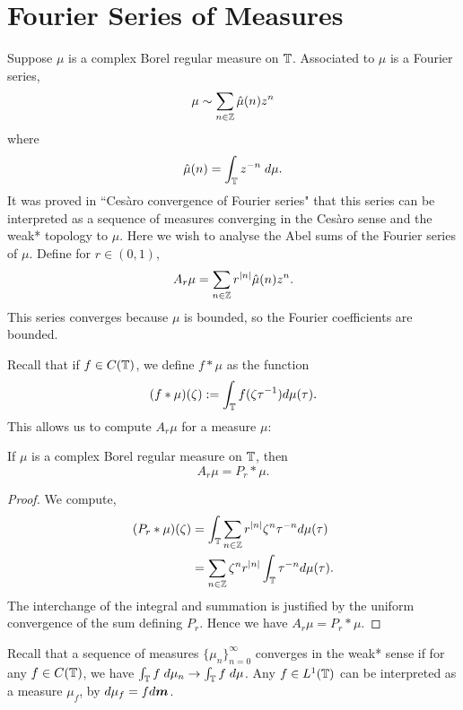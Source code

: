\section{Fourier Series of Measures}
Suppose $\mu$ is a complex Borel regular measure on $\mathbb{T}$. Associated
to $\mu$ is a Fourier series,
\begin{equation*}
    \mu \sim \sum_{n \in \mathbb{Z}} \hat{\mu}(n) z^n
\end{equation*}
where
\begin{equation*}
    \hat{\mu}(n) = \int_{\mathbb{T}} z^{-n} \;d\mu.
\end{equation*}
It was proved in ``Ces\`aro convergence of Fourier series" that this series
can be interpreted as a sequence of measures converging in the Ces\`aro sense
and the weak* topology to $\mu$. Here we wish to analyse the Abel sums of the 
Fourier series of $\mu$. 
Define for $r \in (0,1)$,
\begin{equation*}
    A_r \mu = \sum_{n \in \mathbb{Z}} r^{|n|} \hat{\mu}(n) z^n.
\end{equation*}
This series converges because $\mu$ is bounded, so the Fourier coefficients 
are bounded.

Recall that if $f \in C(\mathbb{T})$, we define $f*\mu$ as the function
\begin{equation*}
    (f*\mu)(\zeta) := \int_{\mathbb{T}} f(\zeta \tau^{-1})d\mu(\tau).
\end{equation*}
This allows us to compute $A_r\mu$ for a measure $\mu$:
\begin{proposition}
    If $\mu$ is a complex Borel regular measure on $\mathbb{T}$, then
    \begin{equation*}
        A_r \mu = P_r * \mu.
    \end{equation*}
\end{proposition}
\begin{proof}
    We compute,
    \begin{align*}
        (P_r * \mu)(\zeta) &= \int_{\mathbb{T}} \sum_{n \in \mathbb{Z}} r^{|n|} \zeta^n \tau^{-n} d\mu(\tau)\\
        &= \sum_{n \in \mathbb{Z}} \zeta^nr^{|n|}\int_{\mathbb{T}} \tau^{-n} d\mu(\tau).
    \end{align*}
    The interchange of the integral and summation is justified by the uniform convergence
    of the sum defining $P_r$. Hence we have $A_r \mu = P_r * \mu$. 
\end{proof} 

Recall that a sequence of measures $\{\mu_n\}_{n=0}^\infty$ converges
in the weak* sense if for any $f \in C(\mathbb{T})$, 
we have $\int_{\mathbb{T}} f\;d\mu_n \rightarrow \int_{\mathbb{T}} f\;d\mu$.
Any $f \in L^1(\mathbb{T})$ can be interpreted as a measure $\mu_f$, by $d\mu_f = fd\boldsymbol{m}$. 

